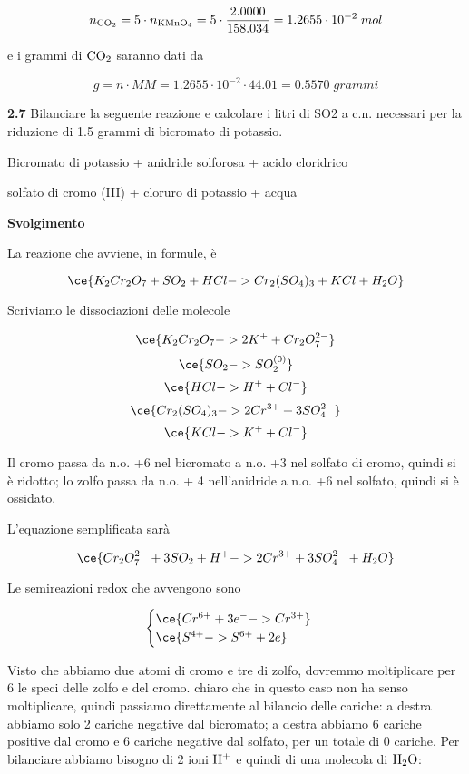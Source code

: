 $$n_{\rm CO_2}=5 \cdot n_{\rm KMnO_4}
=5 \cdot \frac{2.0000}{158.034}
=1.2655 \cdot 10^{-2}\;mol$$

e i grammi di $\rm CO_2$ saranno dati da

$$g=n \cdot MM=1.2655 \cdot 10^{-2} \cdot 44.01
=0.5570\;grammi$$

\vspace{0.2cm}\textbf{2.7} Bilanciare la seguente reazione e calcolare i litri di SO2 a c.n. necessari per la riduzione di 1.5
grammi di bicromato di potassio.

\begin{center}
    Bicromato di potassio + anidride solforosa + acido cloridrico \ce{->}

    \ce{->} solfato di cromo (III) + cloruro di potassio + acqua
\end{center}

\large\textbf{Svolgimento}\normalsize

\vspace{0.2cm}La reazione che avviene, in formule, è

$$\ce{K_2Cr_2O_7 + SO_2 + HCl -> Cr_2(SO_4)_3 + KCl + H_2O}$$

Scriviamo le dissociazioni delle molecole

$$\ce{K_2Cr_2O_7 -> 2K^+ + Cr_2O_7^{2-}}$$
$$\ce{SO_2 -> SO_2^{(0)}}$$
$$\ce{HCl -> H^+ + Cl^-}$$
$$\ce{Cr_2(SO_4)_3 -> 2Cr^{3+} + 3SO_4^{2-}}$$
$$\ce{KCl -> K^+ + Cl^-}$$

Il cromo passa da n.o. +6 nel bicromato a n.o. +3 nel solfato di cromo, quindi si è ridotto; lo zolfo passa da n.o. + 4 nell'anidride a n.o. +6 nel solfato, quindi si è ossidato.

L'equazione semplificata sarà

$$\ce{Cr_2O_7^{2-} + 3SO_2 + H^+ -> 2Cr^{3+} + 3SO_4^{2-} + H_2O}$$

Le semireazioni redox che avvengono sono

$$\begin{cases}
    \ce{Cr^{6+} +3e^- -> Cr^{3+}}\\
    \ce{S^{4+} -> S^{6+} +2e}
\end{cases}$$

Visto che abbiamo due atomi di cromo e tre di zolfo, dovremmo moltiplicare per 6 le speci delle zolfo e del cromo. \E chiaro che in questo caso non ha senso moltiplicare, quindi passiamo direttamente al bilancio delle cariche: a destra abbiamo solo 2 cariche negative dal bicromato; a destra abbiamo 6 cariche positive dal cromo e 6 cariche negative dal solfato, per un totale di 0 cariche. Per bilanciare abbiamo bisogno di 2 ioni $\rm H^+$ e quindi di una molecola di $\rm H_2O$:

